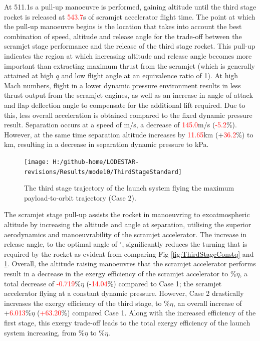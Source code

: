  At 511.1s a pull-up manoeuvre is performed, gaining altitude until the third stage rocket is released at \textcolor{red}{543.7}s of scramjet accelerator flight time. 
 The point at which the pull-up manoeuvre begins is the location that takes into account the best combination of speed, altitude and release angle for the trade-off between the scramjet stage performance and the release of the third stage rocket. This pull-up indicates the region at which increasing altitude and release angle becomes more important than extracting maximum thrust from the scramjet (which is generally attained at high $q$ and low flight angle at an equivalence ratio of 1).
At high Mach numbers, flight in a lower dynamic pressure environment results in less thrust output from the scramjet engines, as well as an increase in angle of attack and flap deflection angle to compensate for the additional lift required. Due to this, less overall acceleration is obtained compared to the fixed dynamic pressure result. Separation occurs at a speed of \secondthirdSeparationvStandardNoReturn m/s, a decrease of \textcolor{red}{145.0}m/s (\textcolor{red}{-5.2}\%). However, at the same time separation altitude increases by \textcolor{red}{11.65}km (+\textcolor{red}{36.2}\%) to \secondthirdSeparationAltqStandardNoReturn km, resulting in a decrease in separation dynamic pressure to \secondthirdSeparationqStandardNoReturn kPa. 
\begin{figure}[ht!]%
	\centering
	\texttt{[image: H:/github-home/LODESTAR-revisions/Results/mode10/ThirdStageStandard]}
	\caption{The third stage trajectory of the launch system flying the maximum payload-to-orbit trajectory (Case 2).}
	\label{fig:ThirdStageStandardNoReturn}
\end{figure}
The scramjet stage pull-up assists the rocket in manoeuvring to exoatmospheric altitude by increasing the altitude and angle at separation, utilising the superior aerodynamics and manoeuvrability of the scramjet accelerator. The increase in release angle, to the optimal angle of \secondthirdSeparationgammaStandardNoReturn$^\circ$, significantly reduces the turning that is required by the rocket as evident from comparing Fig \ref{fig:ThirdStageConstq} and \ref{fig:ThirdStageStandardNoReturn}. 
Overall, the altitude raising manoeuvres that the scramjet accelerator performs result in a decrease in the exergy efficiency of the scramjet accelerator to \secondExergyEffStandardNoReturn\%$\eta$, a total decrease of \textcolor{red}{-0.719}\%$\eta$ (-\textcolor{red}{14.04}\%) compared to Case 1; the scramjet accelerator flying at a constant dynamic pressure. However, Case 2 drastically increases the exergy efficiency of the third stage, to \thirddExergyEffStandardNoReturn\%$\eta$, an overall increase of +\textcolor{red}{6.013}\%$\eta$ (\textcolor{red}{+63.20}\%) compared Case 1.  
Along with the increased efficiency of the first stage, this exergy trade-off leads to the total exergy efficiency of the launch system increasing, from \totalExergyEffConstqNoReturn\%$\eta$ to \totalExergyEffStandardNoReturn\%$\eta$. 

